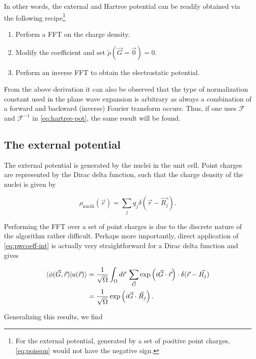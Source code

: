 In other words, the external and Hartree potential can be readily obtained via the following recipe\footnote{For the external potential, generated by a set of positive point charges, \cref{eq:poisson} would not have the negative sign.} 

\begin{enumerate}
    \item Perform a FFT on the charge density.
    \item Modify the coefficient and set $\tilde{\rho}(\vec{G} = \vec{0}) = 0$.
    \item Perform an inverse FFT to obtain the electrostatic potential.
\end{enumerate}

From the above derivation it can also be observed that the type of normalization constant used in the plane wave expansion is arbitrary as always a combination of a forward and backward (inverse) Fourier transform occurs. Thus, if one uses $\mathcal{F}$ and $\mathcal{F}^{-1}$ in \cref{eq:hartree-pot}, the same result will be found.

%
%
%
\subsection{The external potential}

The external potential is generated by the nuclei in the unit cell. Point charges are represented by the Dirac delta function, such that the charge density of the nuclei is given by

\begin{equation}
    \rho_{\text{nuclii}}(\vec{r}) = \sum_{j} q_{j} \delta(\vec{r} - \vec{R_{j}}).
\end{equation}

Performing the FFT over a set of point charges is due to the discrete nature of the algorithm rather difficult. Perhaps more importantly, direct application of \cref{eq:pwcoeff-int} is actually very straightforward for a Dirac delta function and gives

\begin{align}
    \braket{\phi(\vec{G},\vec{r}) | u(\vec{r})} &= \frac{1}{\sqrt{\Omega}} \int_{\Omega} d\vec{r} \; \sum_{\vec{G}} \exp \left(i\vec{G} \cdot \vec{r} \right) \cdot \delta(\vec{r} - \vec{R_{j}}) \\
    &= \frac{1}{\sqrt{\Omega}} \exp \left(i \vec{G} \cdot \vec{R}_{j} \right).
\end{align}

Generalizing this results, we find

